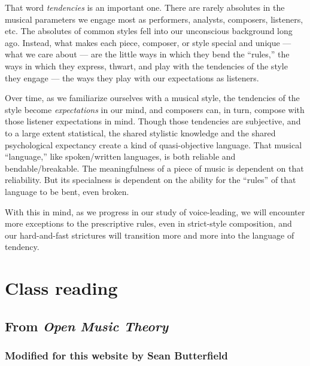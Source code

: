 \documentclass{book}
\begin{document}
That word \emph{tendencies} is an important one. There are rarely absolutes in
the musical parameters we engage most as performers, analysts, composers,
listeners, etc. The absolutes of common styles fell into our unconscious
background long ago. Instead, what makes each piece, composer, or style
special and unique --- what we care about --- are the little ways in which
they bend the ``rules,'' the ways in which they express, thwart, and play with
the tendencies of the style they engage --- the ways they play with our
expectations as listeners.

Over time, as we familiarize ourselves with a musical style, the tendencies of
the style become \emph{expectations} in our mind, and composers can, in turn,
compose with those listener expectations in mind. Though those tendencies are
subjective, and to a large extent statistical, the shared stylistic knowledge
and the shared psychological expectancy create a kind of quasi-objective
language. That musical ``language,'' like spoken/written languages, is both
reliable and bendable/breakable. The meaningfulness of a piece of music is
dependent on that reliability. But its specialness is dependent on the ability
for the ``rules'' of that language to be bent, even broken.

With this in mind, as we progress in our study of voice-leading, we will
encounter more exceptions to the prescriptive rules, even in strict-style
composition, and our hard-and-fast strictures will transition more and more
into the language of tendency.

\hypertarget{class-reading-1}{%
\chapter{Class reading}\label{class-reading-1}}

\hypertarget{from-open-music-theory}{%
\section{\texorpdfstring{From \emph{Open Music
Theory}}{From Open Music Theory}}\label{from-open-music-theory}}

\hypertarget{modified-for-this-website-by-sean-butterfield}{%
\subsection{Modified for this website by Sean
Butterfield}\label{modified-for-this-website-by-sean-butterfield}}
\end{document}
